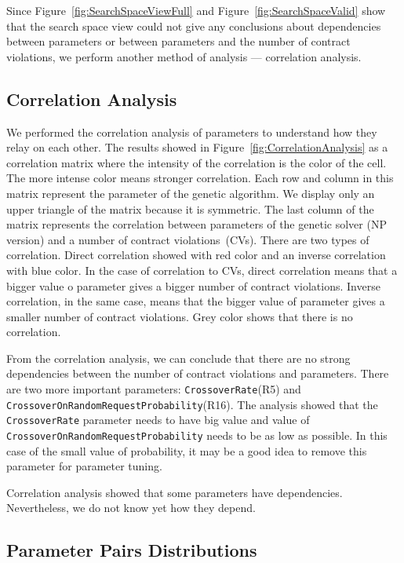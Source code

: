 Since Figure~\ref{fig:SearchSpaceViewFull} and Figure~\ref{fig:SearchSpaceValid} show that the search space view could not give any conclusions about dependencies between parameters or between parameters and the number of contract violations, we perform another method of analysis — correlation analysis.

\subsection{Correlation Analysis}

We performed the correlation analysis of parameters to understand how they relay on each other. The results showed in Figure~\ref{fig:CorrelationAnalysis} as a correlation matrix where the intensity of the correlation is the color of the cell. The more intense color means stronger correlation. Each row and column in this matrix represent the parameter of the genetic algorithm. We display only an upper triangle of the matrix because it is symmetric. The last column of the matrix represents the correlation between parameters of the genetic solver (NP version) and a number of contract violations~(CVs). There are two types of correlation. Direct correlation showed with red color and an inverse correlation with blue color. In the case of correlation to CVs, direct correlation means that a bigger value o parameter gives a bigger number of contract violations. Inverse correlation, in the same case, means that the bigger value of parameter gives a smaller number of contract violations. Grey color shows that there is no correlation.

From the correlation analysis, we can conclude that there are no strong dependencies between the number of contract violations and parameters. There are two more important parameters: \texttt{CrossoverRate}(R5) and \texttt{Cross\-ov\-er\-On\-Ran\-dom\-Re\-qu\-est\-Pro\-ba\-bi\-li\-ty}(R16).
The analysis showed that the \texttt{CrossoverRate} parameter needs to have big value and value of \texttt{Cross\-ov\-er\-On\-Ran\-dom\-Re\-qu\-est\-Pro\-ba\-bi\-li\-ty} needs to be as low as possible. In this case of the small value of probability, it may be a good idea to remove this parameter for parameter tuning.

Correlation analysis showed that some parameters have dependencies. Nevertheless, we do not know yet how they depend.

\subsection{Parameter Pairs Distributions}

